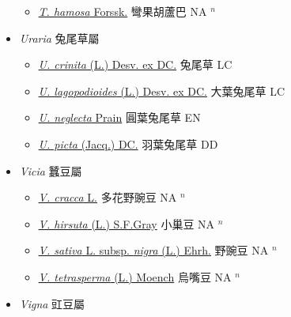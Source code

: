 \begin{itemize}
  \begin{itemize}
        \item[] \href{http://www.theplantlist.org/tpl1.1/search?q=Trigonella+hamosa}{\textit{T. hamosa} Forssk.}   彎果胡蘆巴 NA $^n$
  \end{itemize}
 \item[] \textit{Uraria} 兔尾草屬
                    
  \begin{itemize}
        \item[] \href{http://www.theplantlist.org/tpl1.1/search?q=Uraria+crinita}{\textit{U. crinita} (L.) Desv. ex DC.}   兔尾草 LC
        \item[] \href{http://www.theplantlist.org/tpl1.1/search?q=Uraria+lagopodioides}{\textit{U. lagopodioides} (L.) Desv. ex DC.}   大葉兔尾草 LC
        \item[] \href{http://www.theplantlist.org/tpl1.1/search?q=Uraria+neglecta}{\textit{U. neglecta} Prain}     圓葉兔尾草 EN
        \item[] \href{http://www.theplantlist.org/tpl1.1/search?q=Uraria+picta}{\textit{U. picta} (Jacq.) DC.}   羽葉兔尾草 DD
  \end{itemize}
 \item[] \textit{Vicia} 蠶豆屬
                    
  \begin{itemize}
        \item[] \href{http://www.theplantlist.org/tpl1.1/search?q=Vicia+cracca}{\textit{V. cracca} L.}   多花野豌豆 NA $^n$
        \item[] \href{http://www.theplantlist.org/tpl1.1/search?q=Vicia+hirsuta}{\textit{V. hirsuta} (L.) S.F.Gray}   小巢豆 NA $^n$
        \item[] \href{http://www.theplantlist.org/tpl1.1/search?q=Vicia+sativa+subsp.+nigra}{\textit{V. sativa} L. subsp. \textit{nigra} (L.) Ehrh.}   野豌豆 NA $^n$
        \item[] \href{http://www.theplantlist.org/tpl1.1/search?q=Vicia+tetrasperma}{\textit{V. tetrasperma} (L.) Moench}   烏嘴豆 NA $^n$
  \end{itemize}
 \item[] \textit{Vigna} 豇豆屬
                    

\end{itemize}
